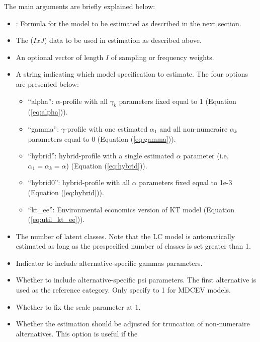 The main arguments are briefly explained below:

\begin{itemize}
\item
  : Formula for the model to be estimated as described in
  the next section.
\item
   The (\(IxJ\)) data to be used in estimation as described
  above.
\item
   An optional vector of length \(I\) of sampling or
  frequency weights.
\item
   A string indicating which model specification to
  estimate. The four options are presented below:

  \begin{itemize}
  \tightlist
  \item
    ``alpha'': \(\alpha\)-profile with all \(\gamma_k\) parameters fixed
    equal to 1 (Equation (\ref{eq:alpha})).
  \item
    ``gamma'': \(\gamma\)-profile with one estimated \(\alpha_1\) and
    all non-numeraire \(\alpha_k\) parameters equal to 0 (Equation
    (\ref{eq:gamma})).
  \item
    ``hybrid'': hybrid-profile with a single estimated \(\alpha\)
    parameter (i.e.~\(\alpha_1 = \alpha_k = \alpha\)) (Equation
    (\ref{eq:hybrid})).
  \item
    ``hybrid0'': hybrid-profile with all \(\alpha\) parameters fixed
    equal to 1e-3 (Equation (\ref{eq:hybrid})).
  \item
    ``kt\_ee'': Environmental economics version of KT model (Equation
    (\ref{eq:util_kt_ee})).
  \end{itemize}
\item
   The number of latent classes. Note that the LC model
  is automatically estimated as long as the prespecified number of
  classes is set greater than 1.
\item
   Indicator to include alternative-specific gammas
  parameters.
\item
   Whether to include alternative-specific psi
  parameters. The first alternative is used as the reference category.
  Only specify to 1 for MDCEV models.
\item
   Whether to fix the scale parameter at 1.
\item
   Whether the estimation should be adjusted for
  truncation of non-numeraire alternatives. This option is useful if the

\end{itemize}
